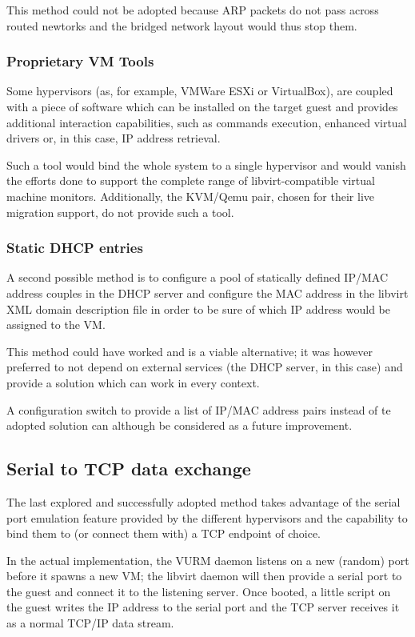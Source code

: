 This method could not be adopted because ARP packets do not pass across routed newtorks and the bridged network layout would thus stop them.


\subsubsection{Proprietary VM Tools}

Some hypervisors (as, for example, VMWare ESXi or VirtualBox), are coupled with a piece of software which can be installed on the target guest and provides additional interaction capabilities, such as commands execution, enhanced virtual drivers or, in this case, IP address retrieval.

Such a tool would bind the whole system to a single hypervisor and would vanish the efforts done to support the complete range of libvirt-compatible virtual machine monitors. Additionally, the KVM/Qemu pair, chosen for their live migration support, do not provide such a tool.


\subsubsection{Static DHCP entries}

A second possible method is to configure a pool of statically defined IP/MAC address couples in the DHCP server and configure the MAC address in the libvirt XML domain description file in order to be sure of which IP address would be assigned to the VM.

This method could have worked and is a viable alternative; it was however preferred to not depend on external services (the DHCP server, in this case) and provide a solution which can work in every context.

A configuration switch to provide a list of IP/MAC address pairs instead of te adopted solution can although be considered as a future improvement.


\subsection{Serial to TCP data exchange}

The last explored and successfully adopted method takes advantage of the serial port emulation feature provided by the different hypervisors and the capability to bind them to (or connect them with) a TCP endpoint of choice.

In the actual implementation, the VURM daemon listens on a new (random) port before it spawns a new VM; the libvirt daemon will then provide a serial port to the guest and connect it to the listening server. Once booted, a little script on the guest writes the IP address to the serial port and the TCP server receives it as a normal TCP/IP data stream.

